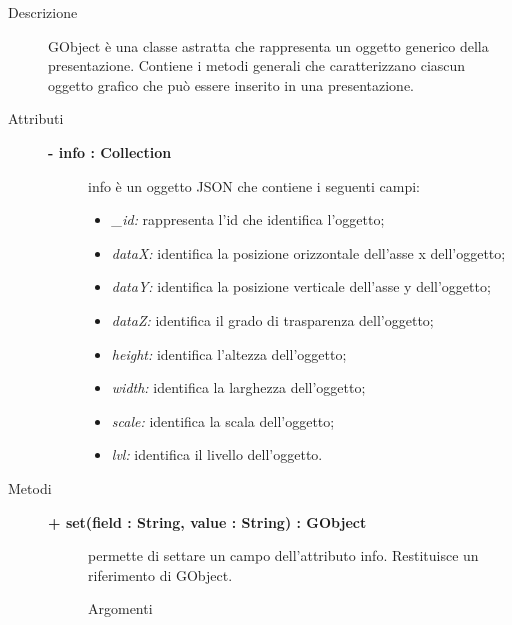 \begin{description}
\item[Descrizione] \hfill
	GObject è una classe astratta che rappresenta un oggetto generico della presentazione. Contiene i metodi generali che caratterizzano ciascun oggetto grafico che può essere inserito in una presentazione.
	
\item[Attributi] \hfill
	\begin{description}
		\item[\textbf{- info : Collection			}] \hfill
			info è un oggetto JSON che contiene i seguenti campi:
				\begin{itemize}
					\item \textit{\_id:} rappresenta l'id che identifica l'oggetto;
					\item \textit{dataX:} identifica la posizione orizzontale dell'asse x dell'oggetto;
					\item \textit{dataY:} identifica la posizione verticale dell'asse y dell'oggetto;
					\item \textit{dataZ:} identifica il grado di trasparenza dell'oggetto; %
					\item \textit{height:} identifica l'altezza dell'oggetto;
					\item \textit{width:} identifica la larghezza dell'oggetto;
					\item \textit{scale:} identifica la scala dell'oggetto; %
					\item \textit{lvl:} identifica il livello dell'oggetto. %
				\end{itemize}
					 
		
	\end{description}
	
	
\item[Metodi] \hfill

	\begin{description}
		\item[\textbf{\color{blue}+ set(field : String, value : String) : GObject			}] \hfill
			permette di settare un campo dell'attributo info. Restituisce un riferimento di GObject.
			
		\begin{description}
			\item[Argomenti] \hfill
				\begin{itemize}
				

\end{itemize}
\end{description}
\end{description}
\end{description}
